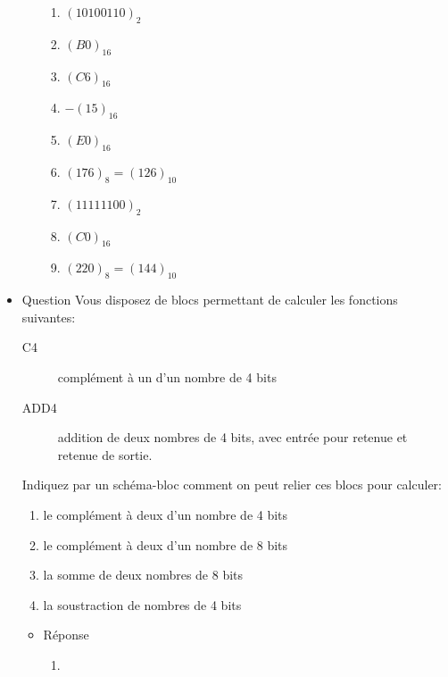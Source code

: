 \documentclass[letter, oneside]{book}
\begin{document}
\begin{itemize}
\begin{itemize}
\begin{enumerate}
\item \((1010 0110)_{2}\)

\item \((B0)_{16}\)

\item \((C6)_{16}\)

\item \(-(15)_{16}\)

\item \((E0)_{16}\)

\item \((176)_{8} = (126)_{10}\)

\item \((1111 1100)_{2}\)

\item \((C0)_{16}\)

\item \((220)_{8} = (144)_{10}\)
\end{enumerate}
\end{itemize}

\item Question
\label{sec:org79227f1}
Vous disposez de blocs permettant de calculer les fonctions suivantes:

\begin{description}
\item[{C4}] complément à un d'un nombre de 4 bits

\item[{ADD4}] addition de deux nombres de 4 bits, avec entrée pour
retenue et retenue de sortie.
\end{description}

Indiquez par un schéma-bloc comment on peut relier ces blocs pour
calculer:

\begin{enumerate}
\item le complément à deux d'un nombre de 4 bits

\item le complément à deux d'un nombre de 8 bits

\item la somme de deux nombres de 8 bits

\item la soustraction de nombres de 4 bits
\end{enumerate}

\begin{itemize}
\item Réponse
\label{sec:org36adcdd}
\begin{enumerate}
\item \begin{center}

\end{center}


\end{enumerate}
\end{itemize}
\end{itemize}
\end{document}
